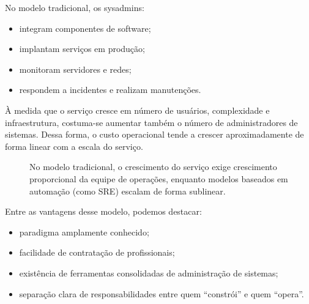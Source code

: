 \documentclass[12pt,a4paper]{report}
\begin{document}
No modelo tradicional, os sysadmins:
\begin{itemize}[nosep]
    \item integram componentes de software;
    \item implantam serviços em produção;
    \item monitoram servidores e redes;
    \item respondem a incidentes e realizam manutenções.
\end{itemize}

À medida que o serviço cresce em número de usuários, complexidade e
infraestrutura, costuma-se aumentar também o número de administradores de
sistemas. Dessa forma, o custo operacional tende a crescer aproximadamente de
forma linear com a escala do serviço.

\begin{figure}[h]
    \centering
    \caption{No modelo tradicional, o crescimento do serviço exige crescimento proporcional da equipe de operações, enquanto modelos baseados em automação (como SRE) escalam de forma sublinear.}
\end{figure}

Entre as vantagens desse modelo, podemos destacar:
\begin{itemize}[nosep]
    \item paradigma amplamente conhecido;
    \item facilidade de contratação de profissionais;
    \item existência de ferramentas consolidadas de administração de sistemas;
    \item separação clara de responsabilidades entre quem ``constrói'' e quem
    ``opera''.
\end{itemize}
\end{document}
